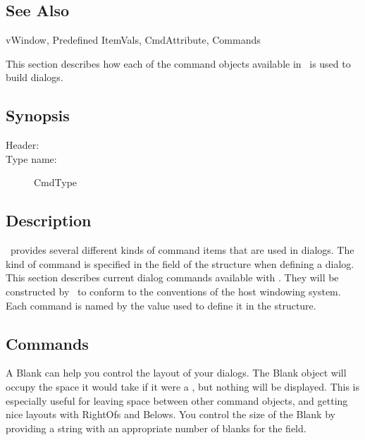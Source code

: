 \subsection* {See Also}

vWindow, Predefined ItemVals, CmdAttribute, Commands


This section describes how each of the command objects available
in \V\ is used to build dialogs.

\subsection* {Synopsis}

\begin{description}
	\item [Header:] 
	\item [Type name:] CmdType
\end{description}

\subsection* {Description}

\V\ provides several different kinds of command items that are used
in dialogs. The kind of command is specified in the 
field of the  structure when defining a
dialog. This section describes current dialog commands available
with \V\@. They will be constructed by \V\ to conform to the
conventions of the host windowing system. Each command is named
by the value used to define it in the 
structure.

\subsection* {Commands}


A Blank can help you control the layout of your dialogs.
The Blank object will occupy the space it would take
if it were a , but nothing will be displayed. This
is especially useful for leaving space between other command
objects, and getting nice layouts with RightOfs and Belows. You
control the size of the Blank by providing a string with an
appropriate number of blanks for the  field.

